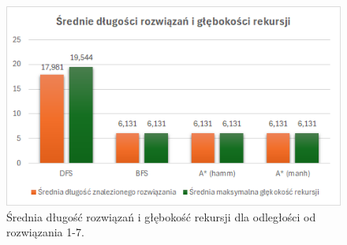 \documentclass{classrep}
\begin{document}
{    \begin{figure}
        \centering
        \includegraphics[width=\textwidth,height=\textheight,keepaspectratio]{average-solution-lenghts}
        \caption{Średnia długość rozwiązań i głębokość rekursji  dla odległości od rozwiązania 1-7. }
        \label{fig:3}
    \end{figure}

}
\end{document}
